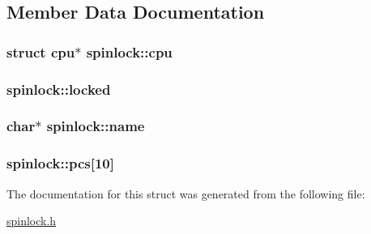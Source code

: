 \subsection{Member Data Documentation}
\subsubsection[{\texorpdfstring{cpu}{cpu}}]{\setlength{\rightskip}{0pt plus 5cm}struct {\bf cpu}$\ast$ spinlock\+::cpu}\hypertarget{structspinlock_a290ae772c8ccb9e8c1580204c31a7f88}{}\label{structspinlock_a290ae772c8ccb9e8c1580204c31a7f88}
\subsubsection[{\texorpdfstring{locked}{locked}}]{ spinlock\+::locked}\hypertarget{structspinlock_a48f3007579f644934d9aba91e5378c03}{}\label{structspinlock_a48f3007579f644934d9aba91e5378c03}
\subsubsection[{\texorpdfstring{name}{name}}]{\setlength{\rightskip}{0pt plus 5cm}char$\ast$ spinlock\+::name}\hypertarget{structspinlock_afbec3274bf8ad9c421695a22f8d9d584}{}\label{structspinlock_afbec3274bf8ad9c421695a22f8d9d584}
\subsubsection[{\texorpdfstring{pcs}{pcs}}]{ spinlock\+::pcs\mbox{[}10\mbox{]}}\hypertarget{structspinlock_ac9ef3f16f664094198af0b9063e23fe0}{}\label{structspinlock_ac9ef3f16f664094198af0b9063e23fe0}


The documentation for this struct was generated from the following file\+:\begin{DoxyCompactItemize}
\item 
\hyperlink{spinlock_8h}{spinlock.\+h}\end{DoxyCompactItemize}
